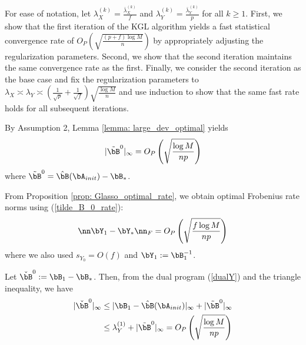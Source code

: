 \begin{IEEEproof}
For ease of notation, let $\lambda_X^{(k)}=\frac{\bar{\lambda}_X^{(k)}}{f}$ and $\lambda_Y^{(k)}=\frac{\bar{\lambda}_Y^{(k)}}{p}$ for all $k \geq 1$. First, we show that the first iteration of the KGL algorithm yields a fast statistical convergence rate of $O_P\left( \sqrt{\frac{(p+f)\log M}{n}} \right)$ by appropriately adjusting the regularization parameters. Second, we show that the second iteration maintains the same convergence rate as the first. Finally, we consider the second iteration as the base case and fix the regularization parameters to $\lambda_X \asymp \lambda_Y  \asymp \left( \frac{1}{\sqrt{p}} + \frac{1}{\sqrt{f}} \right) \sqrt{\frac{\log M}{n}}$ and use induction to show that the same fast rate holds for all subsequent iterations.



By Assumption 2, Lemma \ref{lemma: large_dev_optimal} yields
\begin{equation} \label{tilde_B_0_rate}
	|\tilde{\bB}^0|_\infty = O_P\left( \sqrt{\frac{\log M}{np}} \right)
\end{equation}
where $\tilde{\bB}^0=\hat{\bB}(\bA_{init})-\bB_*$.

From Proposition \ref{prop: Glasso_optimal_rate}, we obtain optimal Frobenius rate norms using (\ref{tilde_B_0_rate}):
\begin{equation} \label{Y_Frob_error}
	\nn \bY_1-\bY_* \nn_F = O_P\left( \sqrt{\frac{f\log M}{np}} \right)
\end{equation}
where we also used $s_{Y_0}=O(f)$ and $\bY_1:=\bB_1^{-1}$.

Let $\check{\bB}^0:=\bB_1 - \bB_*$. %
Then, from the dual program (\ref{dualY}) and the triangle inequality, we have
\begin{align}
	|\check{\bB}^0|_\infty &\leq |\bB_1-\hat{\bB}(\bA_{init})|_\infty + |\tilde{\bB}^0|_\infty \nonumber \\
		&\leq \lambda_Y^{(1)} + |\tilde{\bB}^0|_\infty = O_P\left( \sqrt{\frac{\log M}{np}} \right) \label{check_B_0_rate}
\end{align}


\end{IEEEproof}

